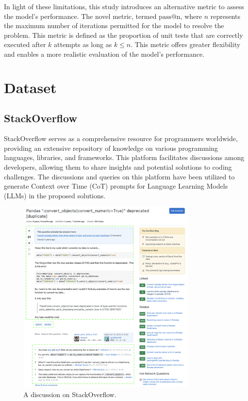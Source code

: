 \documentclass[a4paper,oneside]{book}
\begin{document}
In light of these limitations, this study introduces an alternative metric to assess the model's performance. The novel metric, termed $\text{pass@n}$, where $n$ represents the maximum number of iterations permitted for the model to resolve the problem. This metric is defined as the proportion of unit tests that are correctly executed after $k$ attempts as long as $k \leq n$. This metric offers greater flexibility and enables a more realistic evaluation of the model's performance.

\section{Dataset}
\subsection{}
\subsection{StackOverflow}
StackOverflow serves as a comprehensive resource for programmers worldwide, providing an extensive repository of knowledge on various programming languages, libraries, and frameworks. This platform facilitates discussions among developers, allowing them to share insights and potential solutions to coding challenges. The discussions and queries on this platform have been utilized to generate Context over Time (CoT) prompts for Language Learning Models (LLMs) in the proposed solutions.

\begin{figure}[H]
    \centering
    \includegraphics[width=0.8\textwidth]{img/stackoverflow}
    \caption{A discussion on StackOverflow.}\label{fig:stackoverflow}
\end{figure}
\end{document}
